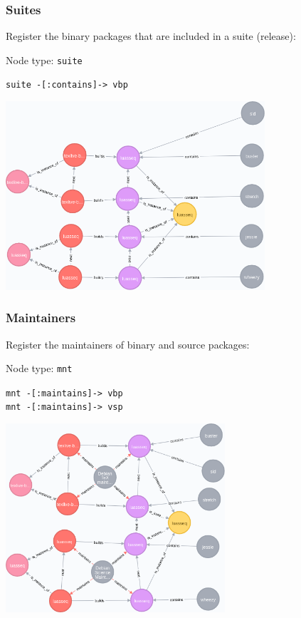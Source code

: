 \documentclass[hyperref]{beamer}
\begin{document}
\begin{frame}
  \frametitle{Suites}

  Register the binary packages that are included in a suite (release):

  \bigskip
  Node type: \texttt{suite}

  \bigskip
  \begin{center}
     \texttt{suite -[:contains]-> vbp}
  \end{center}
\end{frame}

\begin{frame}
  \begin{center}
    \includegraphics[height=7cm]{add-releases.png}
  \end{center}
\end{frame}

\begin{frame}
  \frametitle{Maintainers}

  Register the maintainers of binary and source packages:
  
  \bigskip
  Node type: \texttt{mnt}

  \bigskip
  \begin{center}
     \texttt{mnt -[:maintains]-> vbp}\\
     \texttt{mnt -[:maintains]-> vsp}
  \end{center}
\end{frame}

\begin{frame}
  \begin{center}
    \includegraphics[height=7cm]{add-maintainer.png}
  \end{center}
\end{frame}
\end{document}
